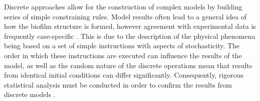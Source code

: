 \skippingparagraph
Discrete approaches allow for the construction of complex models by building series of simple constraining rules. Model results often lead to a general idea of how the biofilm structure is formed, however agreement with experimental data is frequently case-specific \cite{dacunto2017}. This is due to the description of the physical phenomena being based on a set of simple instructions with aspects of stochasticity. The order in which these instructions are executed can influence the results of the model, as well as the random nature of the discrete operations mean that results from identical initial conditions can differ significantly. Consequently, rigorous statistical analysis must be conducted in order to confirm the results from discrete models \cite{alpkvist2006}.\\

